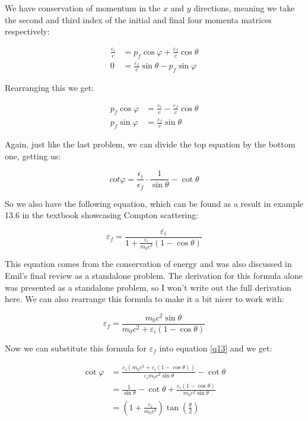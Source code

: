 \documentclass{article}
\theoremstyle{definition}
\numberwithin{equation}{section}
\numberwithin{definition}{section}
\begin{document}
	We have conservation of momentum in the $x$ and $y$ directions, meaning we take the second and third index of the initial and final four momenta matrices respectively:
	
	\begin{align*}
		\frac{\varepsilon_i}{c} &= p_f \cos \varphi  + \frac{\varepsilon_f}{c} \cos \theta\\
		0 &= \frac{\varepsilon_f}{c}\sin \theta - p_f \sin \varphi
		\end{align*}
	
	Rearranging this we get:
	
	\begin{align*}
		p_f \cos \varphi &= \frac{\varepsilon_i}{c} - \frac{\varepsilon_f}{c}\cos\theta\\
		p_f \sin \varphi &= \frac{\varepsilon_f}{c}\sin \theta
	\end{align*}

	Again, just like the last problem, we can divide the top equation by the bottom one, getting us:
	
	\begin{equation}\label{q13}
		cot \varphi = \frac{\epsilon_i}{\epsilon_f} \cdot \frac{1}{\sin \theta} - \cot \theta
		\end{equation}
	
	So we also have the following equation, which can be found as a result in example 13.6 in the textbook showcasing Compton scattering:
	
	\[\varepsilon_f = \frac{\varepsilon_i}{1 + \frac{\varepsilon_i}{m_0c^2}(1-\cos \theta)}\]
	
	This equation comes from the conservation of energy and was also discussed in Emil's final review as a standalone problem. The derivation for this formula alone was presented as a standalone problem, so I won't write out the full derivation here. We can also rearrange this formula to make it a bit nicer to work with:
	
	\[ \varepsilon_f = \frac{m_0c^2\sin\theta}{m_0c^2 + \varepsilon_i(1-\cos\theta)}\]
	
	Now we can substitute this formula for $\varepsilon_f$ into equation \ref{q13} and we get: 
	
	\begin{align*}
		\cot \varphi &= \frac{\varepsilon_i (m_0c^2 + \varepsilon_i(1-\cos \theta))}{\varepsilon_i m_0c^2 \sin \theta} - \cot \theta\\
		&= \frac{1}{\sin \theta} - \cot \theta + \frac{\varepsilon_i (1-\cos \theta)}{m_0c^2 \sin \theta}\\
		&= \left(1 + \frac{\varepsilon_i}{m_0c^2}\right)\tan\left(\frac{\theta}{2}\right)
		\end{align*}
	
\end{document}
